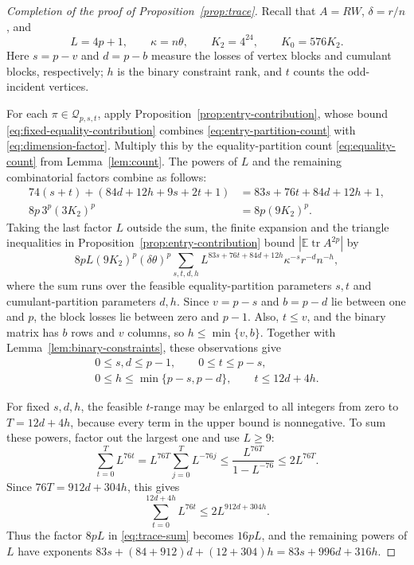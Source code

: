 \documentclass[11pt]{article}
\theoremstyle{definition}
\theoremstyle{remark}
\theoremstyle{plain}
\newcommand{\E}{\mathbb E}
\DeclareMathOperator{\tr}{tr}
\begin{document}
\begin{proof}[Completion of the proof of Proposition~\ref{prop:trace}]
Recall that $A=RW$, $\delta=r/n$, and
\[
 L=4p+1,\qquad \kappa=n\theta,\qquad
 K_2=4^{24},\qquad K_0=576K_2.
\]
Here $s=p-v$ and $d=p-b$ measure the losses of vertex blocks
and cumulant blocks, respectively; $h$ is the binary constraint
rank, and $t$ counts the odd-incident vertices.

For each $\pi\in\mathcal Q_{p,s,t}$, apply
Proposition~\ref{prop:entry-contribution}, whose bound
\eqref{eq:fixed-equality-contribution} combines
\eqref{eq:entry-partition-count} with \eqref{eq:dimension-factor}.
Multiply this by the equality-partition count \eqref{eq:equality-count}
from Lemma~\ref{lem:count}. The powers of $L$ and the remaining
combinatorial factors combine as follows:
\[
 \begin{aligned}
 74(s+t)+(84d+12h+9s+2t+1)
       &=83s+76t+84d+12h+1,\\
 8p\,3^p(3K_2)^p&=8p(9K_2)^p.
 \end{aligned}
\]
Taking the last factor $L$ outside the sum, the finite expansion
and the triangle inequalities in Proposition~\ref{prop:entry-contribution}
bound \(|\E\tr A^{2p}|\) by
\begin{equation}\label{eq:trace-sum}
 8pL(9K_2)^p(\delta\theta)^p
  \sum_{s,t,d,h}L^{83s+76t+84d+12h}\kappa^{-s}r^{-d}n^{-h},
\end{equation}
where the sum runs over the feasible equality-partition parameters
$s,t$ and cumulant-partition parameters $d,h$. Since $v=p-s$
and $b=p-d$ lie between one and $p$, the block losses lie between
zero and $p-1$. Also, $t\le v$, and the binary matrix has $b$ rows
and $v$ columns, so $h\le\min\{v,b\}$. Together with
Lemma~\ref{lem:binary-constraints}, these observations give
\[
 \begin{gathered}
  0\le s,d\le p-1,\qquad 0\le t\le p-s,\\
  0\le h\le\min\{p-s,p-d\},\qquad t\le12d+4h.
 \end{gathered}
\]

For fixed $s,d,h$, the feasible $t$-range may be enlarged to all
integers from zero to $T=12d+4h$, because every term in the upper
bound is nonnegative. To sum these powers, factor out the largest
one and use $L\ge9$:
\[
 \sum_{t=0}^{T}L^{76t}
   =L^{76T}\sum_{j=0}^{T}L^{-76j}
   \le\frac{L^{76T}}{1-L^{-76}}
   \le2L^{76T}.
\]
Since $76T=912d+304h$, this gives
\[
 \sum_{t=0}^{12d+4h}L^{76t}\le2L^{912d+304h}.
\]
Thus the factor $8pL$ in \eqref{eq:trace-sum} becomes $16pL$,
and the remaining powers of $L$ have exponents
$83s+(84+912)d+(12+304)h=83s+996d+316h$.


\end{proof}
\end{document}
